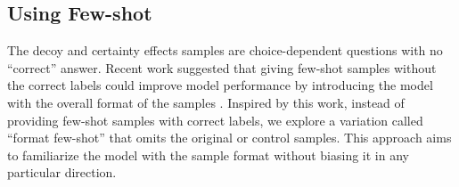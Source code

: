 




\subsection{Using Few-shot}
\label{subsec:few_shot}
The decoy and certainty effects samples are choice-dependent questions with no ``correct'' answer.
Recent work suggested that giving few-shot samples without the correct labels could improve model performance by introducing the model with the overall format of
the samples \cite{min2022rethinking}.
Inspired by this work, instead of providing few-shot samples with correct labels, we explore a variation called ``format few-shot'' that omits the original \biaseddataset or control samples.
This approach aims to familiarize the model with the sample format without biasing it in any particular direction.

